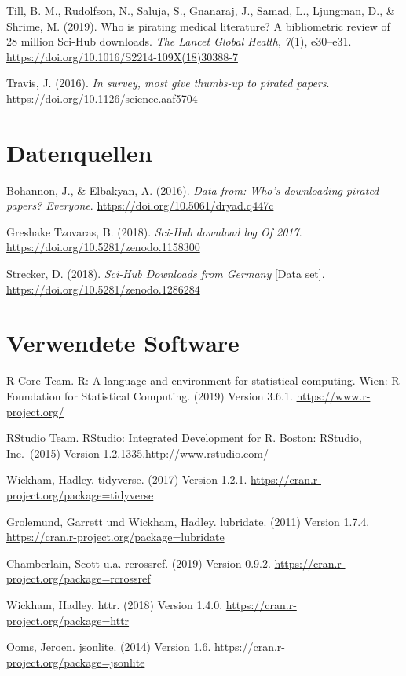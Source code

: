 \documentclass[a4paper,
fontsize=11pt,
oneside,
numbers=noperiodatend,
parskip=half-,
bibliography=totoc,
final
]{scrartcl}
\begin{document}
Till, B. M., Rudolfson, N., Saluja, S., Gnanaraj, J., Samad, L.,
Ljungman, D., \& Shrime, M. (2019). Who is pirating medical literature?
A bibliometric review of 28 million Sci-Hub downloads. \emph{The Lancet
Global Health}, \emph{7}(1), e30--e31.
\url{https://doi.org/10.1016/S2214-109X(18)30388-7}

Travis, J. (2016). \emph{In survey, most give thumbs-up to pirated
papers}. \url{https://doi.org/10.1126/science.aaf5704}

\hypertarget{datenquellen}{%
\section{Datenquellen}\label{datenquellen}}

Bohannon, J., \& Elbakyan, A. (2016). \emph{Data from: Who's downloading
pirated papers? Everyone}. \url{https://doi.org/10.5061/dryad.q447c}

Greshake Tzovaras, B. (2018). \emph{Sci-Hub download log Of 2017}.
\url{https://doi.org/10.5281/zenodo.1158300}

Strecker, D. (2018). \emph{Sci-Hub Downloads from Germany} {[}Data
set{]}. \url{https://doi.org/10.5281/zenodo.1286284}

\hypertarget{verwendete-software}{%
\section{Verwendete Software}\label{verwendete-software}}

R Core Team. R: A language and environment for statistical computing.
Wien: R Foundation for Statistical Computing. (2019) Version 3.6.1.
\url{https://www.r-project.org/}

RStudio Team. RStudio: Integrated Development for R. Boston: RStudio,
Inc.~(2015) Version 1.2.1335.\url{http://www.rstudio.com/}

Wickham, Hadley. tidyverse. (2017) Version 1.2.1.
\url{https://cran.r-project.org/package=tidyverse}

Grolemund, Garrett und Wickham, Hadley. lubridate. (2011) Version 1.7.4.
\url{https://cran.r-project.org/package=lubridate}

Chamberlain, Scott u.a. rcrossref. (2019) Version 0.9.2.
\url{https://cran.r-project.org/package=rcrossref}

Wickham, Hadley. httr. (2018) Version 1.4.0.
\url{https://cran.r-project.org/package=httr}

Ooms, Jeroen. jsonlite. (2014) Version 1.6.
\url{https://cran.r-project.org/package=jsonlite}
\end{document}
